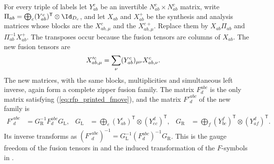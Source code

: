 \begin{lemma}%
    \label{thm:mpdo_complete_zipper_fmatrix_gauge}
    \leanok
    For every triple of labels let $Y^c_{ab}$ be an invertible
    $N_{ab}^{c}\times N_{ab}^{c}$ matrix, write
    $\Pi_{ab}=\bigoplus_c (Y^c_{ab})^{\mathsf T}\otimes\Id_{D_c}$, and let $X_{ab}$ and
    $X^+_{ab}$ be the synthesis and analysis matrices whose blocks are the
    $X^c_{ab,\mu}$ and the $X^{c+}_{ab,\mu}$. Replace them by
    $X_{ab}\Pi_{ab}$ and $\Pi_{ab}^{-1}X^+_{ab}$. The transposes occur because the fusion tensors are columns of $X_{ab}$.
    The new fusion tensors are
    \begin{align}
        X'^c_{ab,\mu}
         & =\sum_\nu (Y^c_{ab})_{\mu\nu}X^c_{ab,\nu}. \notag
    \end{align}
    The new matrices, with the same blocks, multiplicities and simultaneous
    left inverse, again form a complete zipper fusion family. The matrix
    $F^{abc}_d$ is the only matrix satisfying (\ref{eq:rfp_printed_fmove}),
    and the matrix $F'^{abc}_d$ of the new family is
    \begin{align}
        F'^{abc}_d
         & =G_{\mathrm R}^{-1}F^{abc}_d G_{\mathrm L},
         &
        G_{\mathrm L}
         & =\bigoplus_e (Y^e_{ab})^{\mathsf T}\otimes (Y^d_{ec})^{\mathsf T},
         &
        G_{\mathrm R}
         & =\bigoplus_f (Y^f_{bc})^{\mathsf T}\otimes (Y^d_{af})^{\mathsf T}.
        \label{eq:rfp_fmatrix_gauge}
    \end{align}
    Its inverse transforms as
    $(F'^{abc}_d)^{-1}=G_{\mathrm L}^{-1}(F^{abc}_d)^{-1}G_{\mathrm R}$.
    This is the gauge freedom of the fusion tensors in
    \cite[after eq.~\emph{gauge}]{Bultinck2017Anyons} and the induced transformation of
    the $F$-symbols in \cite[lines~415--422]{GarreRubio2023MPOSym}.
\end{lemma}

